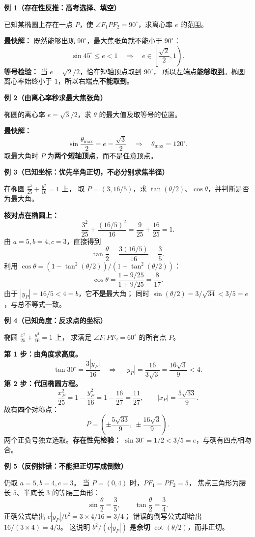 \begin{examplebox}
\textbf{例 1（存在性反推：高考选择、填空）}

已知某椭圆上存在一点 $P$，使
$\angle F_1PF_2=90^\circ$，求离心率 $e$ 的范围。

\textbf{最快解：} 既然能够出现 $90^\circ$，最大焦张角就不能小于 $90^\circ$：
\[
\sin45^\circ\le e<1
\quad\Longrightarrow\quad
\boxed{e\in\left[\frac{\sqrt2}{2},1\right)}.
\]
\textbf{等号检验：} 当 $e=\sqrt2/2$，恰在短轴顶点取到 $90^\circ$，
所以左端点\textbf{能够取到}。椭圆离心率始终小于 $1$，所以右端点\textbf{不能取到}。

\medskip
\textbf{例 2（由离心率秒求最大焦张角）}

椭圆的离心率 $e=\sqrt3/2$，求 $\theta$ 的最大值及取等号的位置。

\textbf{最快解：}
\[
\sin\frac{\theta_{\max}}2=e=\frac{\sqrt3}{2}
\quad\Longrightarrow\quad
\boxed{\theta_{\max}=120^\circ}.
\]
取最大角时 $P$ 为\textbf{两个短轴顶点}，而不是任意顶点。

\medskip
\textbf{例 3（已知坐标：优先半角正切，不必分别求焦半径）}

在椭圆 $\displaystyle\frac{x^2}{25}+\frac{y^2}{16}=1$ 上，
取 $P=(3,16/5)$，求 $\tan(\theta/2)$、$\cos\theta$，并判断是否为最大角。

\textbf{核对点在椭圆上：}
\[
\frac{3^2}{25}+\frac{(16/5)^2}{16}
=\frac9{25}+\frac{16}{25}=1.
\]
由 $a=5,b=4,c=3$，直接得到
\[
\boxed{\tan\frac\theta2=\frac{3(16/5)}{16}=\frac35}.
\]
利用 $\cos\theta=(1-\tan^2(\theta/2))/(1+\tan^2(\theta/2))$：
\[
\boxed{\cos\theta=\frac{1-9/25}{1+9/25}=\frac8{17}}.
\]
由于 $|y_P|=16/5<4=b$，它\textbf{不是}最大角；
同时 $\sin(\theta/2)=3/\sqrt{34}<3/5=e$，与总不等式一致。

\medskip
\textbf{例 4（已知角度：反求点的坐标）}

椭圆 $\displaystyle\frac{x^2}{25}+\frac{y^2}{16}=1$ 上，
求满足 $\angle F_1PF_2=60^\circ$ 的所有点 $P$。

\textbf{第 1 步：由角度求高度。}
\[
\tan30^\circ=\frac{3|y_P|}{16}
\quad\Longrightarrow\quad
|y_P|=\frac{16}{3\sqrt3}=\frac{16\sqrt3}{9}<4.
\]
\textbf{第 2 步：代回椭圆方程。}
\[
\frac{x_P^2}{25}=1-\frac{y_P^2}{16}
=1-\frac{16}{27}=\frac{11}{27},
\qquad
|x_P|=\frac{5\sqrt{33}}9.
\]
故有\textbf{四个}对称点：
\[
\boxed{P=\left(\pm\frac{5\sqrt{33}}9,
\ \pm\frac{16\sqrt3}9\right)}.
\]
两个正负号独立选取。\textbf{存在性先检验：}
$\sin30^\circ=1/2<3/5=e$，与确有四点相吻合。

\medskip
\textbf{例 5（反例排错：不能把正切写成倒数）}

仍取 $a=5,b=4,c=3$。
当 $P=(0,4)$ 时，$PF_1=PF_2=5$，
焦点三角形为腰长 $5$、半底长 $3$ 的等腰三角形：
\[
\sin\frac\theta2=\frac35,\qquad
\tan\frac\theta2=\frac34.
\]
正确公式给出 $c|y_P|/b^2=3\times4/16=3/4$；
错误的倒写公式却给出 $16/(3\times4)=4/3$。
这说明 $b^2/(c|y_P|)$ 是\textbf{余切} $\cot(\theta/2)$，而非正切。
\end{examplebox}
